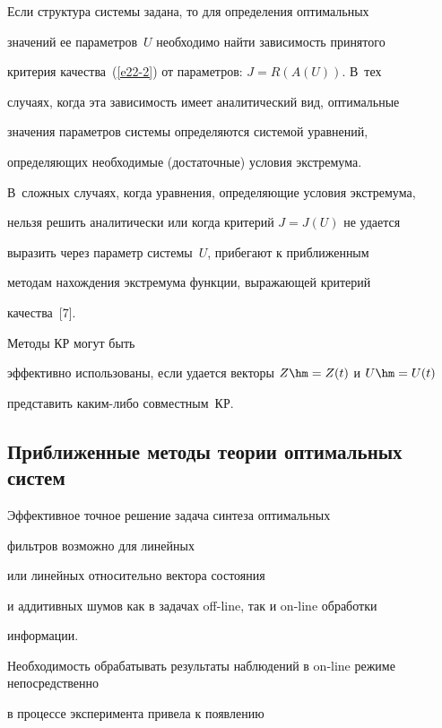  Если структура системы задана, то  для определения оптимальных


 значений ее параметров~$U$ необходимо найти зависимость принятого


 критерия качества~(\ref{e22-2}) от параметров:  $J= R(A(U))$. В~тех


 случаях, когда эта зависимость имеет аналитический вид, оптимальные


 значения параметров системы определяются системой уравнений,


 определяющих необходимые (достаточные) условия экстремума.


 В~слож\-ных случаях, когда уравнения, определяющие условия экстремума,


 нельзя решить аналитически или когда критерий  $J=J(U)$ не удается


 выразить через параметр сис\-те\-мы~$U$, прибегают к приближенным


 методам нахождения экстремума функции, выражающей критерий


 качества~[7].





Методы КР  могут быть


эффективно использованы, если удается векторы $Z\hm= Z(t)$ и $U\hm=U(t)$


представить каким-либо совместным~КР.








\subsection{Приближенные методы теории оптимальных систем}





  Эффективное точное решение задача синтеза оптимальных


фильтров возможно для линейных


или линейных относительно вектора состояния


и аддитивных шумов как в задачах off-line, так и  on-line обработки


информации.





Необходимость обрабатывать результаты наблюдений в  on-line режиме непосредственно


в процессе эксперимента привела к появлению


